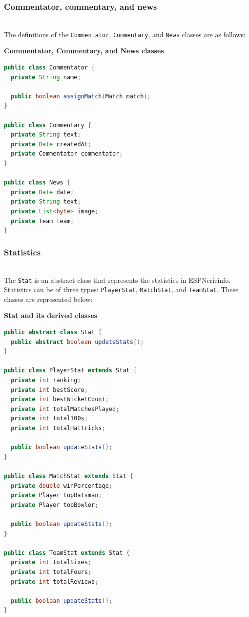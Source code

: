 \subsubsection{Commentator, commentary, and news}\label{F7WoLt45BiKA-XrjdBsE1}
\\
The definitions of the \texttt{Commentator}, \texttt{Commentary}, and \texttt{News} classes are as follows:

\textbf{Commentator, Commentary, and News classes}

\begin{lstlisting}[language=Java]
public class Commentator {
  private String name;

  public boolean assignMatch(Match match);
}

public class Commentary {
  private String text;
  private Date createdAt;
  private Commentator commentator;
}

public class News {
  private Date date;
  private String text;
  private List<byte> image;
  private Team team;
}
\end{lstlisting}

\subsubsection{Statistics}\label{9MtpKYbuFpRgBXrGlJ1V6}
\\
The \texttt{Stat} is an abstract class that represents the statistics in ESPNcricinfo. Statistics can be of three types: \texttt{PlayerStat}, \texttt{MatchStat}, and \texttt{TeamStat}. These classes are represented below:

\textbf{Stat and its derived classes}

\begin{lstlisting}[language=Java]
public abstract class Stat {
  public abstract boolean updateStats();
}

public class PlayerStat extends Stat {
  private int ranking;
  private int bestScore;
  private int bestWicketCount;
  private int totalMatchesPlayed;
  private int total100s;
  private int totalHattricks;

  public boolean updateStats();
}

public class MatchStat extends Stat {
  private double winPercentage;
  private Player topBatsman;
  private Player topBowler;

  public boolean updateStats();
}

public class TeamStat extends Stat {
  private int totalSixes;
  private int totalFours;
  private int totalReviews; 

  public boolean updateStats();
}
\end{lstlisting}

